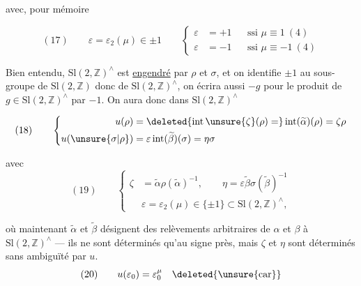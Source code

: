 

avec, pour mémoire

\[
(17)\qquad
\varepsilon=\varepsilon_2(\mu)\in\pm1
\qquad
\left\{\begin{aligned}
\varepsilon&=+1&&\text{ssi }\mu\equiv1\ (4)\\
\varepsilon&=-1&&\text{ssi }\mu\equiv-1\ (4)
\end{aligned}\right.
\]

Bien entendu, $\mathrm{Sl}(2,\mathbb Z)^\wedge$ est
\uline{engendré}  par $\rho$ et $\sigma$,
et on identifie $\pm1$ au sous-groupe 
de $\mathrm{Sl}(2,\mathbb Z)$ donc de
$\mathrm{Sl}(2,\mathbb Z)^\wedge$, on écrira aussi
$-g$ pour le produit de $g\in\mathrm{Sl}(2,\mathbb Z)^\wedge$
par $-1$. On aura donc dans $\mathrm{Sl}(2,\mathbb Z)^\wedge$

\[
(18)\qquad
\left\{\begin{aligned}
u(\rho)&=\deleted{\operatorname{int}\unsure{\zeta}(\rho)=}
\operatorname{int}(\widetilde{\alpha})(\rho)=\zeta\rho\\
u(\unsure{\sigma|\rho})&=
\varepsilon\operatorname{int}(\widetilde{\beta})(\sigma)=\eta\sigma
\end{aligned}\right.
\]

avec
\[
(19)\qquad
\left\{\begin{aligned}
\zeta&=\widetilde{\alpha}\rho(\widetilde{\alpha})^{-1},\qquad
\eta=\varepsilon\widetilde{\beta}\sigma(\widetilde{\beta})^{-1}\\
&\varepsilon=\varepsilon_2(\mu)\in\{\pm1\}\subset
\mathrm{Sl}(2,\mathbb Z)^\wedge,
\end{aligned}\right.
\]



où maintenant $\widetilde{\alpha}$ et $\widetilde{\beta}$
désignent des relèvements arbitraires de $\alpha$ et $\beta$ à
$\mathrm{Sl}(2,\mathbb Z)^\wedge$ --- ils ne sont déterminés
qu'au signe près, mais
$\zeta$ et $\eta$ sont déterminés sans ambiguïté par $u$.
\[
(20)\qquad u(\varepsilon_0)=\varepsilon_0^\mu
\quad\deleted{\text{\unsure{car}}}
\]

